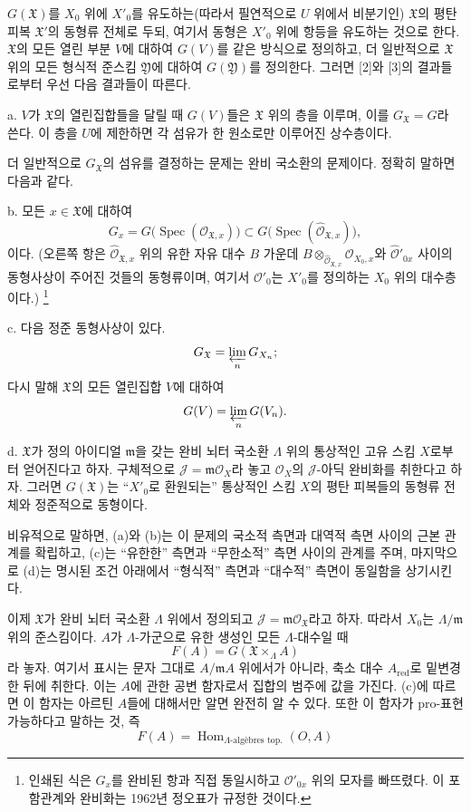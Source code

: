 \documentclass[11pt,twoside,openany]{book}
\numberwithin{equation}{section}
\newcommand{\sourceunit}{front}
\newcommand{\src}[1]{%
  \phantomsection\hypertarget{src:\sourceunit:#1}{}%
  \marginpar{\raggedleft\footnotesize\sffamily #1}%
}
\theoremstyle{plain}
\theoremstyle{definition}
\theoremstyle{remark}
\begin{document}
\src{388}
$G(\mathfrak X)$를 $X_0$ 위에 $X'_0$를 유도하는(따라서 필연적으로
$U$ 위에서 비분기인) $\mathfrak X$의 평탄 피복 $\mathfrak X'$의 동형류
전체로 두되, 여기서 동형은 $X'_0$ 위에 항등을 유도하는 것으로 한다.
$\mathfrak X$의 모든 열린 부분 $V$에 대하여 $G(V)$를 같은 방식으로
정의하고, 더 일반적으로 $\mathfrak X$ 위의 모든 형식적 준스킴
$\mathfrak Y$에 대하여 $G(\mathfrak Y)$를 정의한다. 그러면 [2]와 [3]의
결과들로부터 우선 다음 결과들이 따른다.

\noindent a. $V$가 $\mathfrak X$의 열린집합들을 달릴 때 $G(V)$들은
$\mathfrak X$ 위의 층을 이루며, 이를 $G_{\mathfrak X}=G$라 쓴다. 이 층을
$U$에 제한하면 각 섬유가 한 원소로만 이루어진 상수층이다.

더 일반적으로 $G_{\mathfrak X}$의 섬유를 결정하는 문제는 완비 국소환의
문제이다. 정확히 말하면 다음과 같다.

\noindent b. 모든 $x\in\mathfrak X$에 대하여
\[
  G_x=G\bigl(\operatorname{Spec}(\mathcal O_{\mathfrak X,x})\bigr)
  \subset
  G\bigl(\operatorname{Spec}(\widehat{\mathcal O}_{\mathfrak X,x})\bigr),
\]
이다. (오른쪽 항은 $\widehat{\mathcal O}_{\mathfrak X,x}$ 위의 유한 자유
대수 $B$ 가운데
$B\otimes_{\widehat{\mathcal O}_{\mathfrak X,x}}\mathcal O_{X_0,x}$와
$\widehat{\mathcal O}'_{0x}$ 사이의 동형사상이 주어진 것들의 동형류이며,
여기서 $\mathcal O'_0$는 $X'_0$를 정의하는 $X_0$ 위의 대수층이다.)
\footnote{인쇄된 식은 $G_x$를 완비된 항과 직접 동일시하고
$\mathcal O'_{0x}$ 위의 모자를 빠뜨렸다. 이 포함관계와 완비화는 1962년
정오표가 규정한 것이다.}

\noindent c. 다음 정준 동형사상이 있다.
\[
  G_{\mathfrak X}=\varprojlim_nG_{X_n} ;
\]
다시 말해 $\mathfrak X$의 모든 열린집합 $V$에 대하여
\[
  G(V)=\varprojlim_nG(V_n).
\]

\noindent d. $\mathfrak X$가 정의 아이디얼 $\mathfrak m$을 갖는 완비
뇌터 국소환 $\Lambda$ 위의 통상적인 고유 스킴 $X$로부터 얻어진다고 하자.
구체적으로 $\mathcal J=\mathfrak m\mathcal O_X$라 놓고
$\mathcal O_X$의 $\mathcal J$-아딕 완비화를 취한다고 하자. 그러면
$G(\mathfrak X)$는 ``$X'_0$로 환원되는'' 통상적인 스킴 $X$의 평탄
피복들의 동형류 전체와 정준적으로 동형이다.

비유적으로 말하면, (a)와 (b)는 이 문제의 국소적 측면과 대역적 측면 사이의
근본 관계를 확립하고, (c)는 ``유한한'' 측면과 ``무한소적'' 측면 사이의
관계를 주며, 마지막으로 (d)는 명시된 조건 아래에서 ``형식적'' 측면과
``대수적'' 측면이 동일함을 상기시킨다.

이제 $\mathfrak X$가 완비 뇌터 국소환 $\Lambda$ 위에서 정의되고
$\mathcal J=\mathfrak m\mathcal O_{\mathfrak X}$라고 하자. 따라서 $X_0$는
$\Lambda/\mathfrak m$ 위의 준스킴이다. $A$가 $\Lambda$-가군으로 유한
생성인 모든 $\Lambda$-대수일 때
\[
  F(A)=G(\mathfrak X\times_\Lambda A)
\]
라 놓자. 여기서 표시는 문자 그대로 $A/\mathfrak mA$ 위에서가 아니라,
축소 대수 $A_{\mathrm{red}}$로 밑변경한 뒤에 취한다. 이는 $A$에 관한
공변 함자로서 집합의 범주에 값을 가진다. (c)에 따르면 이 함자는 아르틴
$A$들에 대해서만 알면 완전히 알 수 있다. 또한 이 함자가 pro-표현 가능하다고
말하는 것, 즉
\[
  F(A)=\operatorname{Hom}_{\Lambda\text{-algèbres top.}}(O,A)
\]
\end{document}
